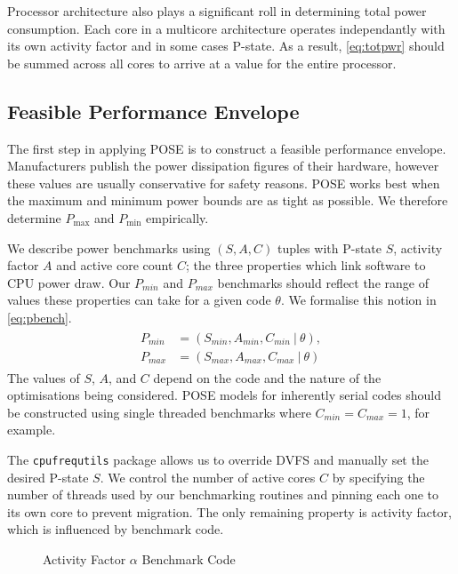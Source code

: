 Processor architecture also plays a significant roll in determining total power consumption.
Each core in a multicore architecture operates independantly with its own activity factor and in some cases P-state.
As a result, \autoref{eq:totpwr} should be summed across all cores to arrive at a value for the entire processor.

\subsection{Feasible Performance Envelope}
The first step in applying POSE is to construct a feasible performance envelope.
Manufacturers publish the power dissipation figures of their hardware, however these values are usually conservative for safety reasons.
POSE works best when the maximum and minimum power bounds are as tight as possible.
We therefore determine $P_{\max}$ and $P_{\min}$ empirically.

We describe power benchmarks using $(S,A,C)$ tuples with P-state $S$, activity factor $A$ and active core count $C$; the three properties which link software to CPU power draw.
Our $P_{min}$ and $P_{max}$ benchmarks should reflect the range of values these properties can take for a given code $\theta$.
We formalise this notion in \autoref{eq:pbench}.
\begin{align}
  \label{eq:pbench}
  \begin{split}
    P_{min} &= (S_{min}, A_{min}, C_{min}~\vert~\theta), \\
    P_{max} &= (S_{max}, A_{max}, C_{max}~\vert~\theta) 
  \end{split}
\end{align}
The values of $S$, $A$, and $C$ depend on the code and the nature of the optimisations being considered.
POSE models for inherently serial codes should be constructed using single threaded benchmarks where $C_{min} = C_{max} = 1$, for example.

The \texttt{cpufrequtils} package allows us to override DVFS and manually set the desired P-state $S$.
We control the number of active cores $C$ by specifying the number of threads used by our benchmarking routines and pinning each one to its own core to prevent migration.
The only remaining property is activity factor, which is influenced by benchmark code.

\begin{figure}[ht]
\centering
\lstset{basicstyle=\ttfamily\footnotesize\bfseries, frame=tb} %

\caption{Activity Factor $\alpha$ Benchmark Code}
\label{fig:microbench}
\end{figure}

